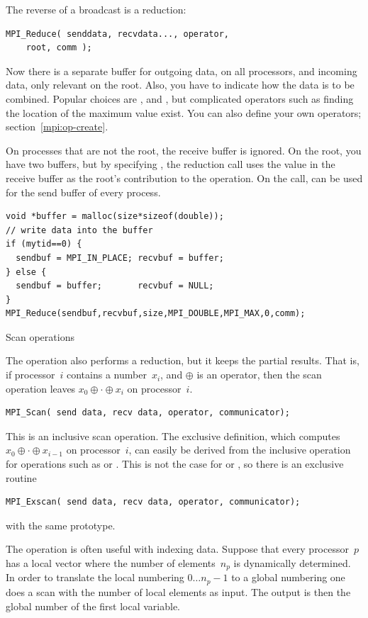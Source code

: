 The reverse of a broadcast is a reduction:
\begin{verbatim}
MPI_Reduce( senddata, recvdata..., operator,
    root, comm ); 
\end{verbatim}
Now there is a separate buffer for outgoing data, on all processors,
and incoming data, only relevant on the root. Also, you have to
indicate how the data is to be combined. Popular choices are
,  and
, but complicated operators such as finding the
location of the maximum value exist. You can also define your own
operators; section~\ref{mpi:op-create}.

On processes that are not the root, the receive buffer is ignored. On the root, 
you have two buffers, but by specifying , the reduction call
uses the value in the receive buffer as the root's contribution to the operation.
On the  call,  can be used for the send buffer of
every process.

\begin{verbatim}
void *buffer = malloc(size*sizeof(double));
// write data into the buffer
if (mytid==0) {
  sendbuf = MPI_IN_PLACE; recvbuf = buffer;
} else {
  sendbuf = buffer;       recvbuf = NULL;
}
MPI_Reduce(sendbuf,recvbuf,size,MPI_DOUBLE,MPI_MAX,0,comm);
\end{verbatim}

 {Scan operations}

The  operation also performs a reduction, but it keeps 
the partial results. That is, if processor~$i$ contains a number~$x_i$, 
and $\oplus$ is an operator,
then the scan operation leaves $x_0\oplus\cdot\oplus x_i$ on processor~$i$.
\begin{verbatim}
MPI_Scan( send data, recv data, operator, communicator);
\end{verbatim}
This is an inclusive scan operation. The exclusive definition, which computes
$x_0\oplus\cdot\oplus x_{i-1}$ on processor~$i$, can easily be derived
from the inclusive operation for operations such as  or .
This is not the case for  or , so there is an
exclusive routine
\begin{verbatim}
MPI_Exscan( send data, recv data, operator, communicator);
\end{verbatim}
with the same prototype. 

The  operation is often useful with indexing data. Suppose that
every processor~$p$ has a local vector where the number of elements~$n_p$ is dynamically 
determined. In order to translate the local numbering $0\ldots n_p-1$ to a global numbering
one does a scan with the number of local elements as input. The output is then the global 
number of the first local variable.

